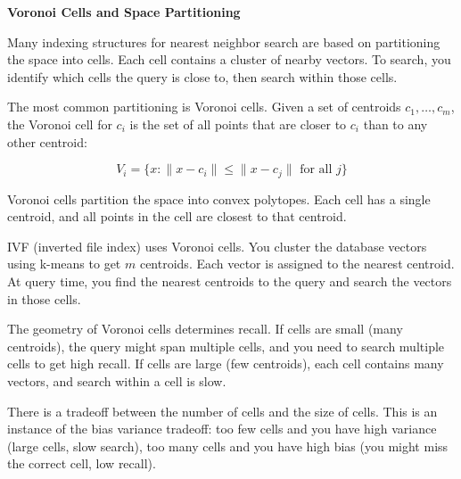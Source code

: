 \begin{geometrylens}
\textbf{Voronoi Cells and Space Partitioning}

\vspace{0.5em}

Many indexing structures for nearest neighbor search are based on partitioning the space into cells. Each cell contains a cluster of nearby vectors. To search, you identify which cells the query is close to, then search within those cells.

\vspace{0.5em}

The most common partitioning is Voronoi cells. Given a set of centroids $c_1, \ldots, c_m$, the Voronoi cell for $c_i$ is the set of all points that are closer to $c_i$ than to any other centroid:

\begin{equation*}
V_i = \{x : \|x - c_i\| \leq \|x - c_j\| \text{ for all } j\}
\end{equation*}

Voronoi cells partition the space into convex polytopes. Each cell has a single centroid, and all points in the cell are closest to that centroid.

\vspace{0.5em}

IVF (inverted file index) uses Voronoi cells. You cluster the database vectors using k-means to get $m$ centroids. Each vector is assigned to the nearest centroid. At query time, you find the nearest centroids to the query and search the vectors in those cells.

\vspace{0.5em}

The geometry of Voronoi cells determines recall. If cells are small (many centroids), the query might span multiple cells, and you need to search multiple cells to get high recall. If cells are large (few centroids), each cell contains many vectors, and search within a cell is slow.

\vspace{0.5em}

There is a tradeoff between the number of cells and the size of cells. This is an instance of the bias variance tradeoff: too few cells and you have high variance (large cells, slow search), too many cells and you have high bias (you might miss the correct cell, low recall).
\end{geometrylens}

\vspace{2em}

